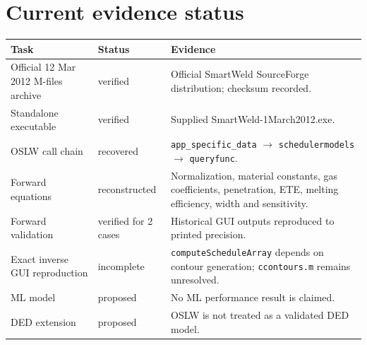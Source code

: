 \documentclass[11pt,a4paper]{article}
\begin{document}
\section{Current evidence status}
\begin{longtable}{p{}p{}p{}}
\toprule Task & Status & Evidence\\ \midrule
Official 12 Mar 2012 M-files archive & verified & Official SmartWeld SourceForge distribution; checksum recorded.\\
Standalone executable & verified & Supplied SmartWeld-1March2012.exe.\\
OSLW call chain & recovered & \texttt{app\_specific\_data} $\rightarrow$ \texttt{schedulermodels} $\rightarrow$ \texttt{queryfunc}.\\
Forward equations & reconstructed & Normalization, material constants, gas coefficients, penetration, ETE, melting efficiency, width and sensitivity.\\
Forward validation & verified for 2 cases & Historical GUI outputs reproduced to printed precision.\\
Exact inverse GUI reproduction & incomplete & \texttt{computeScheduleArray} depends on contour generation; \texttt{ccontours.m} remains unresolved.\\
ML model & proposed & No ML performance result is claimed.\\
DED extension & proposed & OSLW is not treated as a validated DED model.\\
\bottomrule
\end{longtable}
\end{document}
